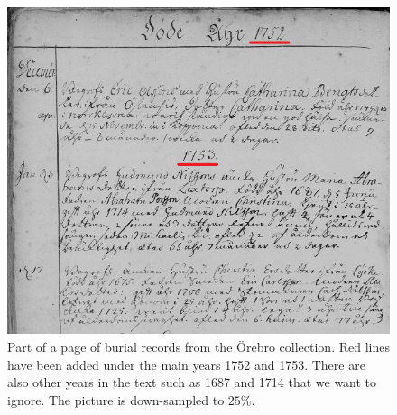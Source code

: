 
\begin{figure}
    \centering
    \includegraphics[scale=0.5]{resources/orebro_page.png}
    \caption{Part of a page of burial records from the {\"O}rebro collection. Red lines have been added under the main years 1752 and 1753. There are also other years in the text such as 1687 and 1714 that we want to ignore. The picture is down-sampled to $25\%$.}
    \label{fig:page}
\end{figure}
